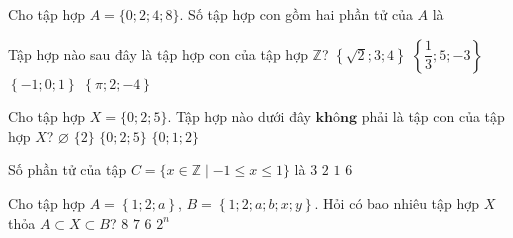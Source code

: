 

\begin{ex}%
	Cho tập hợp $A=\{0;2;4;8\}$. Số tập hợp con gồm hai phần  tử của $A$ là
\end{ex}

\begin{ex}%
	 Tập hợp nào sau đây là tập hợp con của tập hợp $\mathbb{Z}$?
	\choice 
		{$\left\{\sqrt{2};3;4\right\}$} 
		{$\left\{\dfrac{1}{3};5;-3\right\}$} 
		{\True $\left\{-1;0;1\right\}$} 
		{$\left\{\pi;2;-4\right\}$} 
\end{ex}

\begin{ex}%
	Cho tập hợp $X=\{0; 2; 5\}$. Tập hợp nào dưới  đây $\textbf{không}$ phải là tập con của tập hợp $X$?
	\choice 
		{$\varnothing$} 
		 {$\{2\}$}
		{$\{0;  2; 5\}$}
		{\True $\{0; 1; 2\}$} 
\end{ex}

\begin{ex}%
	Số phần tử của tập $C=\{x  \in \mathbb{Z} \mid-1 \leqslant x \leqslant 1\}$ là
	\choice 
		{\True  $3$}
		 {$2$}
		{$1$} 
		{$6$} 
\end{ex}

\begin{ex}%
	Cho tập hợp $A=\left\{1; 2; a\right\}$, $B=\left\{1; 2; a; b; x; y\right\}$. Hỏi có bao nhiêu tập  hợp $X$ thỏa $A\subset X\subset B$?
	\choice 
		{\True $8$} 
		{$7$} 
		{$6$} 
		 {$2^n$}
\end{ex}

